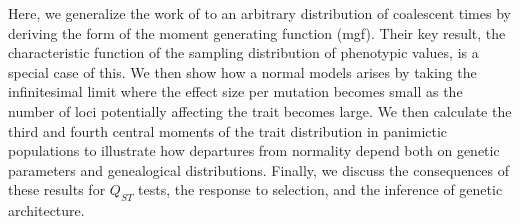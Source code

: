 Here, we generalize the work of \citet{Schraiber2015} to an arbitrary
distribution of coalescent times by deriving the form of the moment generating
function (mgf). Their key result, the characteristic function of the sampling
distribution of phenotypic values, is a special case of this. We then show how a
normal models arises by taking the infinitesimal limit where the effect size per
mutation becomes small as the number of loci potentially affecting the trait
becomes large. We then calculate the third and fourth central moments of the
trait distribution in panimictic populations to illustrate how departures from
normality depend both on genetic parameters and genealogical distributions.
Finally, we discuss the consequences of these results for $Q_{ST}$ tests, the
response to selection, and the inference of genetic architecture.


